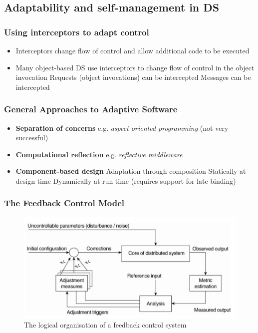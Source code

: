 \subsection{Adaptability and self-management in DS}
\subsubsection{Using interceptors to adapt control}
\begin{itemize}
	\item Interceptors change flow of control and allow additional code to be executed
	\item Many object-based DS use interceptors to change flow of control in the object invocation
	\subitem Requests (object invocations) can be intercepted
	\subitem Messages can be intercepted	
\end{itemize}
\subsubsection{General Approaches to Adaptive Software}
\begin{itemize}
	\item\textbf{Separation of concerns}
	\subitem e.g. \textit{aspect oriented programming} (not very successful)
	\item\textbf{Computational reflection}
	\subitem e.g. \textit{reflective middleware}
	\item\textbf{Component-based design}
	\subitem Adaptation through composition
	\subsubitem Statically at design time
	\subsubitem Dynamically at run time (requires support for late binding)	
\end{itemize}

\subsubsection{The Feedback Control Model}
\begin{figure}[H]
	\includegraphics[width=0.8\linewidth]{feedback}	
	\centering\caption{The logical organisation of a feedback control system}
\end{figure}



